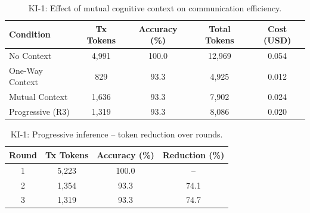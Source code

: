 \begin{table}[t]
\centering
\caption{KI-1: Effect of mutual cognitive context on communication efficiency.}
\label{tab:ki1}
\begin{tabular}{lcccc}
\toprule
Condition & Tx Tokens & Accuracy (\%) & Total Tokens & Cost (USD) \\
\midrule
No Context       & 4,991 & 100.0 & 12,969 & 0.054 \\
One-Way Context  &   829 &  93.3 &  4,925 & 0.012 \\
Mutual Context   & 1,636 &  93.3 &  7,902 & 0.024 \\
Progressive (R3) & 1,319 &  93.3 &  8,086 & 0.020 \\
\bottomrule
\end{tabular}
\end{table}

\begin{table}[t]
\centering
\caption{KI-1: Progressive inference -- token reduction over rounds.}
\label{tab:ki1-progressive}
\begin{tabular}{cccc}
\toprule
Round & Tx Tokens & Accuracy (\%) & Reduction (\%) \\
\midrule
1 & 5,223 & 100.0 & --    \\
2 & 1,354 &  93.3 & 74.1  \\
3 & 1,319 &  93.3 & 74.7  \\
\bottomrule
\end{tabular}
\end{table}
